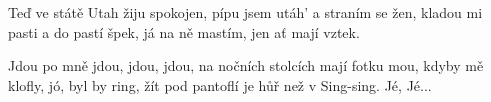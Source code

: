 \beginverse{}
\chordsoff{}
Teď ve státě Utah žiju spokojen,
pípu jsem utáh' a straním se žen,
\lrep{} kladou mi pasti a do pastí špek,
já na ně mastím, jen ať mají vztek. \rrep{}
\chordson{}
\endverse{}

\beginchorus{}
\chordsoff{}
Jdou po mně jdou, jdou, jdou,
na nočních stolcích mají fotku mou,
kdyby mě klofly, jó, byl by ring,
žít pod pantoflí je hůř než v Sing-sing. Jé, Jé... 
\chordson{}
\endchorus{}

\endsong{}
